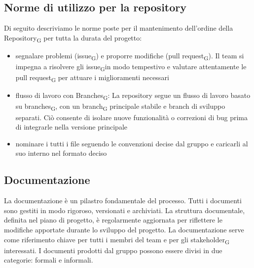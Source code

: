 \documentclass{article}
\begin{document}
\subsection{Norme di utilizzo per la repository}
Di seguito descriviamo le norme poste per il mantenimento dell'ordine della Repository\textsubscript{G} per tutta la durata del progetto:
\begin{itemize}
    \item segnalare problemi (issue\textsubscript{G}) e proporre modifiche (pull request\textsubscript{G}). Il team si impegna a risolvere gli issue\textsubscript{G}in modo tempestivo e valutare attentamente le pull request\textsubscript{G} per attuare i miglioramenti necessari
    \item flusso di lavoro con Branches\textsubscript{G}: La repository segue un flusso di lavoro basato su branches\textsubscript{G}, con un branch\textsubscript{G} principale stabile e branch di sviluppo separati. Ciò consente di isolare nuove funzionalità o correzioni di bug prima di integrarle nella versione principale
    \item nominare i tutti i file seguendo le convenzioni decise dal gruppo e caricarli al suo interno nel formato deciso
\end{itemize}



\subsection{Documentazione}
La documentazione è un pilastro fondamentale del processo. Tutti i documenti sono gestiti in modo rigoroso, versionati e archiviati. La struttura documentale, definita nel piano di progetto, è regolarmente aggiornata per riflettere le modifiche apportate durante lo sviluppo del progetto. La documentazione serve come riferimento chiave per tutti i membri del team e per gli stakeholder\textsubscript{G} interessati. I documenti prodotti dal gruppo possono essere divisi in due categorie: formali e informali.
\end{document}
